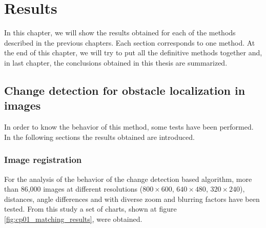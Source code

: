 

\chapter{Results}\label{ch:chapter08}

In this chapter, we will show the results obtained for each of the methods described in the previous chapters. Each section corresponds to one method. At the end of this chapter, we will try to put all the definitive methods together and, in last chapter, the conclusions obtained in this thesis are summarized.

\graphicspath{{./images/chapter01/bmps/}{./images/chapter01/vects/}{./images/chapter01/}}
\section{Change detection for obstacle localization in images}\label{ch:chapter01_02}

In order to know the behavior of this method, some tests have been performed. In the following sections the results obtained are introduced.

\subsection{Image registration}\label{ch:chapter01_02_01}

For the analysis of the behavior of the change detection based algorithm, more than 86,000 images at different resolutions ($800 \times 600$, $640 \times 480$, $320 \times 240$), distances, angle differences and with diverse zoom and blurring factors have been tested. From this study a set of charts, shown at figure \ref{fig:cp01_matching_results}, were obtained.

